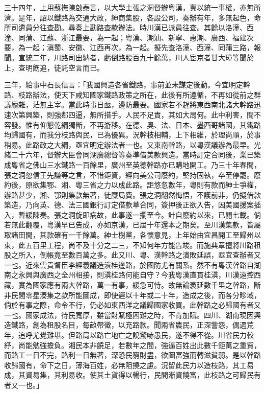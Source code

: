 \begin{pinyinscope}
三十四年，上用蘇撫陳啟泰言，以大學士張之洞督辦粵漢，冀以統一事權，亦無所濟。是年，詔以鐵路為交通大政，紳商集股，各設公司，奏辦有年，多無起色，命所司遴員分往查勘。尋奏上勘路查款辦法。時川漢已派員往查。其餘以洛潼、西潼、同蒲、江蘇、浙江最要，為一起；粵漢、潮汕、新寧、惠潮、廣西、福建次要，為一起；滇蜀、安徽、江西再次，為一起。擬先查洛潼、西潼、同蒲三路，報聞。宣統二年，川路司出納者，虧倒路股百九十餘萬，川人宦京者甘大璋等聞於上，查明飭追，徒託空言而已。

三年，給事中石長信言：「我國興造各省鐵路，事前並未謀定後動。今宜明定幹路、枝路辦法，使天下咸知國家鐵路政策之所在，此後有所遵循，不再如從前之群議龐雜，茫無主宰。當此時事日亟，邊防最要。國家若不趕將東西南北諸大幹路迅速次第興築，則強鄰四逼，無所措手。人民不足責，其如大局何。此中利害，間不容發。惟有仰懇乾綱獨斷，不再游移。在德、奧、法、日本、墨西哥諸國，其鐵路均歸國有，而我分枝路與民，已為優異。況幹枝相輔，上下相維，於理尚順，於事稍易。此路政之大綱，亟宜明定辦法者一也。又東南幹路，以粵漢議辦為最早。光緒二十六年，督辦大臣會同湖廣總督等奏準借美款興造。當時訂定合同後，業已築成粵省之佛山三水鐵路一百餘里，廣州至英德幹路亦已購地開工。乃三十年春間，張之洞忽信王先謙等之言，不惜鉅資，經向美公司廢約，堅持固執，卒至停罷。廢約後，原欲集鄂、湘、粵三省之力以成此路。詎悠忽數年，粵則有款而紳士爭權，辦路甚少，湘、鄂則集款無著，徒糜局費。張之洞翻然悔悟，不護前非，仍擬借款築造，乃向英、德、法三國銀行訂定借款草合同，簽押後正欲入告，因美國援案插入，暫緩陳奏。張之洞旋即病故，此事遂一擱至今。計自廢約以來，已閱七載。倘若無此翻覆，粵漢早已告成，亦如京漢，已屆十年還本之期矣。至川漢集款，皆屬取諸田間，其款確有一千餘萬。紳士樹黨，各懷意見，上年始由宜昌開工至歸州以東，此五百里工程，尚不及十分之二三，不知何年方能告竣。而施典章擅將川路租股之所入，倒帳竟至數百萬之多。此又川、粵、漢幹路之潰敗延誤，亟宜查辦者又一也。近來雲貴督臣李經羲議造滇桂邊路，於國防尤有關系。然不有粵漢幹路自湖南之永興與廣西之全州相接，則滇桂路何能自守？今我粵漢直貫桂滇，川漢遠控西藏，實為國家應有兩大幹路，萬一有事，緩急可恃。故無論袤延數千里之幹路，斷非民間零星湊集之款所能圖成，即使遲以十年或二十年，造成之後，而各分畛域，倘於有事之際，命令不行，仍必如東西洋之議歸國家收買。此幹路之必歸國有者又一也。國家成法，待民寬厚，雖當財賦極困難之時，不肯加賦。四川、湖南現因興造鐵路，創為租股名目，每畝帶徵，以充路款。聞兩省農民，正深訾怨，偶遇荒年，追呼尤覺難堪。但路局以路亡地亡之說驚哧愚民，遂不得不從。川省民力較紓，尚能勉強擔負。湘民本非饒足，若數年之間，強逼百姓出此數千鉅萬之重貲，而路工一日不完，路利一日無著，深恐民窮財盡，欲圖富強而轉滋貧弱。是以幹路收歸國有，命下之日，薄海百姓，必無阻撓之慮。況留此民力以造枝路，其工易成，其資易集，其利易收。使其土貨得以暢行，民間漸資饒富，此枝路之可歸民有者又一也。」


\end{pinyinscope}
